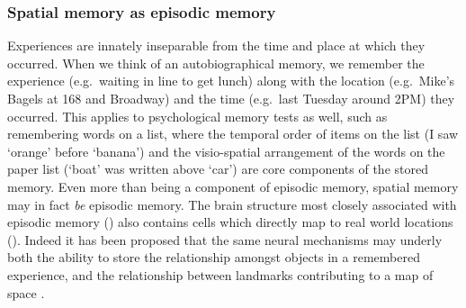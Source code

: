 \subsubsection{Spatial memory as episodic memory}
\label{sec:intro:memory:spatial-episodic}
Experiences are innately inseparable from the time and place at which they occurred.
When we think of an autobiographical memory, we remember the experience (e.g.~waiting in line to get lunch) along with the location (e.g.~Mike's Bagels at 168 and Broadway) and the time (e.g.~last Tuesday around 2PM) they occurred.
This applies to psychological memory tests as well, such as remembering words on a list, where the temporal order of items on the list (I saw `orange' before `banana') and the visio-spatial arrangement of the words on the paper list (`boat' was written above `car') are core components of the stored memory.
Even more than being a component of episodic memory, spatial memory may in fact \emph{be} episodic memory.
The brain structure most closely associated with episodic memory () also contains cells which directly map to real world locations ().
Indeed it has been proposed that the same neural mechanisms may underly both the ability to store the relationship amongst objects in a remembered experience, and the relationship between landmarks contributing to a map of space \citep{Buzsaki2013}.


